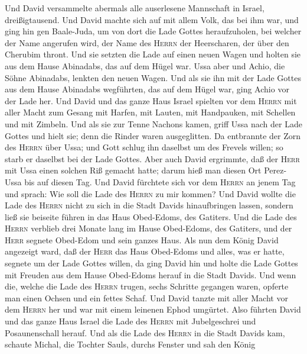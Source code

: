  Und David versammelte abermals alle auserlesene
Mannschaft in Israel, dreißigtausend.  Und David machte
sich auf mit allem Volk, das bei ihm war, und ging hin gen Baale-Juda,
um von dort die Lade Gottes heraufzuholen, bei welcher der Name
angerufen wird, der Name des \textsc{Herrn} der Heerscharen, der über
den Cherubim thront.  Und sie setzten die Lade auf einen
neuen Wagen und holten sie aus dem Hause Abinadabs, das auf dem Hügel
war. Ussa aber und Achio, die Söhne Abinadabs, lenkten den neuen Wagen.
 Und als sie ihn mit der Lade Gottes aus dem Hause
Abinadabs wegführten, das auf dem Hügel war, ging Achio vor der Lade
her.  Und David und das ganze Haus Israel spielten vor dem
\textsc{Herrn} mit aller Macht zum Gesang mit Harfen, mit Lauten, mit
Handpauken, mit Schellen und mit Zimbeln.  Und als sie zur
Tenne Nachons kamen, griff Ussa nach der Lade Gottes und hielt sie; denn
die Rinder waren ausgeglitten.  Da entbrannte der Zorn des
\textsc{Herrn} über Ussa; und Gott schlug ihn daselbst um des Frevels
willen; so starb er daselbst bei der Lade Gottes.  Aber
auch David ergrimmte, daß der \textsc{Herr} mit Ussa einen solchen Riß
gemacht hatte; darum hieß man diesen Ort Perez-Ussa bis auf diesen Tag.
 Und David fürchtete sich vor dem \textsc{Herrn} an jenem
Tag und sprach: Wie soll die Lade des \textsc{Herrn} zu mir kommen?
 Und David wollte die Lade des \textsc{Herrn} nicht zu
sich in die Stadt Davids hinaufbringen lassen, sondern ließ sie beiseite
führen in das Haus Obed-Edoms, des Gatiters.  Und die
Lade des \textsc{Herrn} verblieb drei Monate lang im Hause Obed-Edoms,
des Gatiters, und der \textsc{Herr} segnete Obed-Edom und sein ganzes
Haus.  Als nun dem König David angezeigt ward, daß der
\textsc{Herr} das Haus Obed-Edoms und alles, was er hatte, segnete um
der Lade Gottes willen, da ging David hin und holte die Lade Gottes mit
Freuden aus dem Hause Obed-Edoms herauf in die Stadt Davids.
 Und wenn die, welche die Lade des \textsc{Herrn} trugen,
sechs Schritte gegangen waren, opferte man einen Ochsen und ein fettes
Schaf.  Und David tanzte mit aller Macht vor dem
\textsc{Herrn} her und war mit einem leinenen Ephod umgürtet.
 Also führten David und das ganze Haus Israel die Lade
des \textsc{Herrn} mit Jubelgeschrei und Posaunenschall herauf.
 Und als die Lade des \textsc{Herrn} in die Stadt Davids
kam, schaute Michal, die Tochter Sauls, durchs Fenster und sah den König
